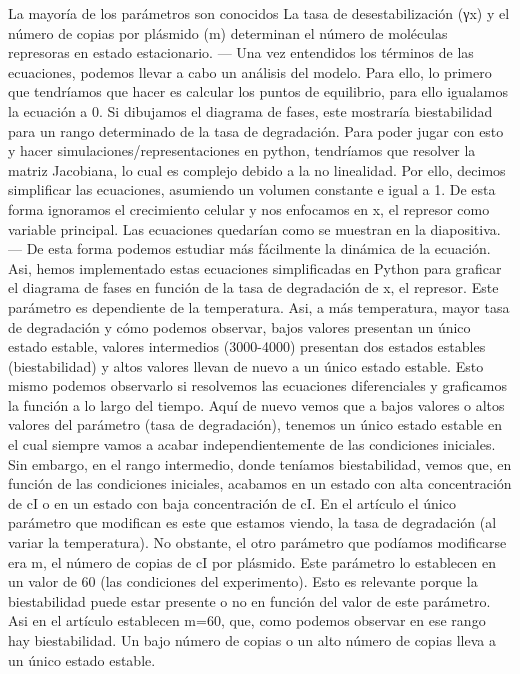La mayoría de los parámetros son conocidos
La tasa de desestabilización (γx) y el número de copias por plásmido (m) determinan el número de moléculas represoras en estado estacionario.
---
Una vez entendidos los términos de las ecuaciones, podemos llevar a cabo un análisis del modelo. Para ello, lo primero que tendríamos que hacer es calcular los puntos de equilibrio, para ello igualamos la ecuación a 0. Si dibujamos el diagrama de fases, este mostraría biestabilidad para un rango determinado de la tasa de degradación. 
Para poder jugar con esto y hacer simulaciones/representaciones en python, tendríamos que resolver la matriz Jacobiana, lo cual es complejo debido a la no linealidad. Por ello, decimos simplificar las ecuaciones, asumiendo un volumen constante e igual a 1. De esta forma ignoramos el crecimiento celular y nos enfocamos en x, el represor como variable principal.
Las ecuaciones quedarían como se muestran en la diapositiva. 
---
De esta forma podemos estudiar más fácilmente la dinámica de la ecuación. Asi, hemos implementado estas ecuaciones simplificadas en Python para graficar el diagrama de fases en función de la tasa de degradación de x, el represor. Este parámetro es dependiente de la temperatura. Asi, a más temperatura, mayor tasa de degradación y cómo podemos observar, bajos valores presentan un único estado estable, valores intermedios (3000-4000) presentan dos estados estables (biestabilidad) y altos valores llevan de nuevo a un único estado estable. 
Esto mismo podemos observarlo si resolvemos las ecuaciones diferenciales y graficamos la función a lo largo del tiempo. Aquí de nuevo vemos que a bajos valores o altos valores del parámetro (tasa de degradación), tenemos un único estado estable en el cual siempre vamos a acabar independientemente de las condiciones iniciales. Sin embargo, en el rango intermedio, donde teníamos biestabilidad, vemos que, en función de las condiciones iniciales, acabamos en un estado con alta concentración de cI o en un estado con baja concentración de cI.
En el artículo el único parámetro que modifican es este que estamos viendo, la tasa de degradación (al variar la temperatura). No obstante, el otro parámetro que podíamos modificarse era m, el número de copias de cI por plásmido. Este parámetro lo establecen en un valor de 60 (las condiciones del experimento). Esto es relevante porque la biestabilidad puede estar presente o no en función del valor de este parámetro. Asi en el artículo establecen m=60, que, como podemos observar en ese rango hay biestabilidad. Un bajo número de copias o un alto número de copias lleva a un único estado estable. 
